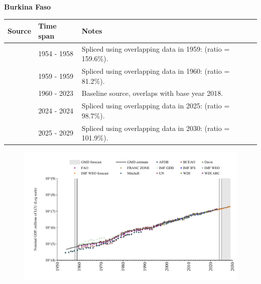 \documentclass[12pt,a4paper,landscape]{article}
\begin{document}
\begin{adjustbox}{max totalsize={\paperwidth}{\paperheight},center}
\begin{minipage}[t][\textheight][t]{\textwidth}
\vspace*{0.5cm}
{}
\begin{center}
{\Large\bfseries Burkina Faso}
\end{center}
\vspace{0.5cm}
\begin{table}[H]
\centering
\small
\begin{tabular}{|l|l|l|}
\hline
\textbf{Source} & \textbf{Time span} & \textbf{Notes} \\
\hline
\rowcolor{white}\cite{Mitchell}& 1954 - 1958 &Spliced using overlapping data in 1959: (ratio = 159.6\%).\\
\rowcolor{lightgray}\cite{IMF_GDD}& 1959 - 1959 &Spliced using overlapping data in 1960: (ratio = 81.2\%).\\
\rowcolor{white}\cite{WDI}& 1960 - 2023 &Baseline source, overlaps with base year 2018.\\
\rowcolor{lightgray}\cite{BCEAO}& 2024 - 2024 &Spliced using overlapping data in 2025: (ratio = 98.7\%).\\
\rowcolor{white}\cite{IMF_WEO_forecast}& 2025 - 2029 &Spliced using overlapping data in 2030: (ratio = 101.9\%).\\
\hline
\end{tabular}
\end{table}
\begin{figure}[H]
\centering
\includegraphics[width=\textwidth,height=0.6\textheight,keepaspectratio]{graphs/BFA_nGDP.pdf}
\end{figure}
\end{minipage}
\end{adjustbox}
\end{document}
